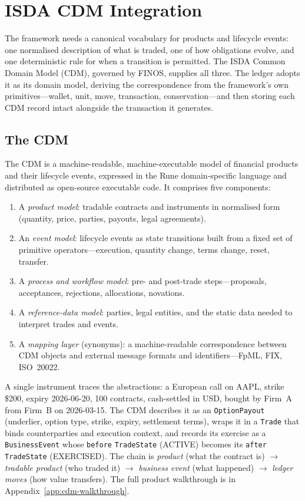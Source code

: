 \section{ISDA CDM Integration}
\label{sec:sec13}\label{sec:cdm}

The framework needs a canonical vocabulary for products and lifecycle events: one normalised description of what is traded, one of how obligations evolve, and one deterministic rule for when a transition is permitted. The ISDA Common Domain Model (CDM), governed by FINOS, supplies all three. The ledger adopts it as its domain model, deriving the correspondence from the framework's own primitives---wallet, unit, move, transaction, conservation---and then storing each CDM record intact alongside the transaction it generates.

\subsection{The CDM}

The CDM is a machine-readable, machine-executable model of financial products and their lifecycle events, expressed in the Rune domain-specific language and distributed as open-source executable code. It comprises five components:

\begin{enumerate}[nosep]
\item A \textit{product model}: tradable contracts and instruments in normalised form (quantity, price, parties, payouts, legal agreements).
\item An \textit{event model}: lifecycle events as state transitions built from a fixed set of primitive operators---execution, quantity change, terms change, reset, transfer.
\item A \textit{process and workflow model}: pre- and post-trade steps---proposals, acceptances, rejections, allocations, novations.
\item A \textit{reference-data model}: parties, legal entities, and the static data needed to interpret trades and events.
\item A \textit{mapping layer} (synonyms): a machine-readable correspondence between CDM objects and external message formats and identifiers---FpML, FIX, ISO~20022.
\end{enumerate}

A single instrument traces the abstractions: a European call on AAPL, strike \$200, expiry 2026-06-20, 100 contracts, cash-settled in USD, bought by Firm~A from Firm~B on 2026-03-15. The CDM describes it as an \texttt{OptionPayout} (underlier, option type, strike, expiry, settlement terms), wraps it in a \texttt{Trade} that binds counterparties and execution context, and records its exercise as a \texttt{BusinessEvent} whose \texttt{before} \texttt{TradeState} (ACTIVE) becomes its \texttt{after} \texttt{TradeState} (EXERCISED). The chain is \emph{product} (what the contract is) $\to$ \emph{tradable product} (who traded it) $\to$ \emph{business event} (what happened) $\to$ \emph{ledger moves} (how value transfers). The full product walkthrough is in Appendix~\ref{app:cdm-walkthrough}.

